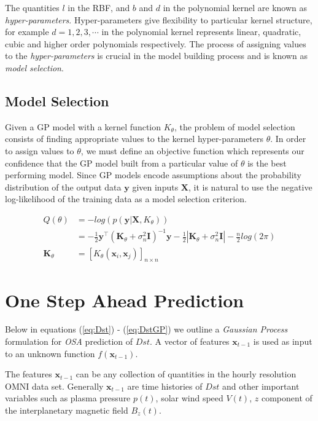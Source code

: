 \documentclass[sw, draft]{AGUTeX}
\begin{document}
\begin{article}
The quantities $l$ in the RBF, and $b$ and $d$ in the polynomial kernel are known as \emph{hyper-parameters}. Hyper-parameters give flexibility to particular kernel structure, for example $d = 1, 2, 3, \cdots$ in the polynomial kernel represents linear, quadratic, cubic and higher order polynomials respectively. The process of assigning values to the \emph{hyper-parameters} is crucial in the model building process and is known as \emph{model selection}. 

\subsection{Model Selection}

Given a GP model with a kernel function $K_\theta$, the problem of model selection consists of finding appropriate values to the kernel hyper-parameters $\theta$. In order to assign values to $\theta$, we must define an objective function which represents our confidence that the GP model built from a particular value of $\theta$ is the best performing model. Since GP models encode assumptions about the probability distribution of the output data $\mathbf{y}$ given inputs $\mathbf{X}$, it is natural to use the negative log-likelihood of the training data as a model selection criterion. 

\begin{align*}
  Q(\theta) & = - log(p(\mathbf{y}|\mathbf{X}, K_\theta)) \\
            & = -\frac{1}{2} \mathbf{y}^\intercal (\mathbf{K}_\theta + \sigma^{2}_n \mathbf{I})^{-1} \mathbf{y} - \frac{1}{2}|\mathbf{K}_\theta + \sigma^{2}_n \mathbf{I}| - \frac{n}{2}log(2\pi) \\
  \mathbf{K}_\theta & = [K_{\theta}(\mathbf{x}_i, \mathbf{x}_j)]_{n \times n}
\end{align*}


\section{One Step Ahead Prediction} \label{sec:osa}

Below in equations (\ref{eq:Dst}) - (\ref{eq:DstGP}) we outline a \emph{Gaussian Process} formulation for \emph{OSA} prediction of $Dst$. A vector of features $\mathbf{x}_{t-1}$ is used as input to an unknown function $f(\mathbf{x}_{t-1})$.

The features $\mathbf{x}_{t-1}$ can be any collection of quantities in the hourly resolution OMNI data set. Generally $\mathbf{x}_{t-1}$ are time histories of $Dst$ and other important variables such as plasma pressure $p(t)$, solar wind speed $V(t)$, $z$ component of the interplanetary magnetic field $B_z(t)$.



\end{article}
\end{document}
